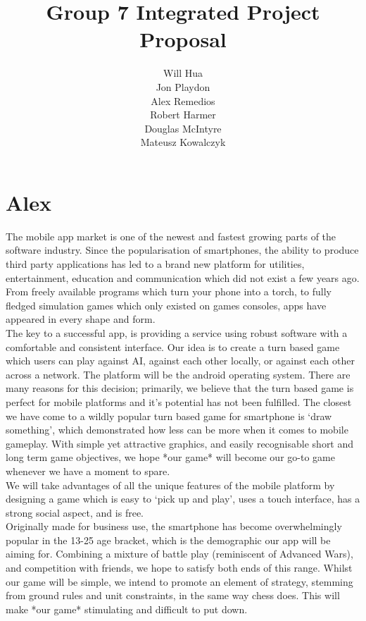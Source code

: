 \documentclass[10pt,a4paper,oneside]{report}
\begin{document}
\title{Group 7 Integrated Project Proposal}
\author{Will Hua\\
        Jon Playdon\\
        Alex Remedios\\
        Robert Harmer\\
        Douglas McIntyre\\
        Mateusz Kowalczyk}
\maketitle
\section*{Alex}

The mobile app market is one of the newest and fastest growing parts of the software industry. Since the popularisation of smartphones, the ability to produce third party applications has led to a brand new platform for utilities, entertainment, education and communication which did not exist a few years ago. From freely available programs which turn your phone into a torch, to fully fledged simulation games which only existed on games consoles, apps have appeared in every shape and form.\\


The key to a successful app, is providing a service using robust software with a comfortable and consistent interface. Our idea is to create a turn based game which users can play against AI, against each other locally, or against each other across a network. The platform will be the android operating system. There are many reasons for this decision; primarily, we believe that the turn based game is perfect for mobile platforms and it’s potential has not been fulfilled. The closest we have come to a wildly popular turn based game for smartphone is ‘draw something’, which demonstrated how less can be more when it comes to mobile gameplay. With simple yet attractive graphics, and easily recognisable short and long term game objectives, we hope *our game* will become our go-to game whenever we have a moment to spare.\\
We will take advantages of all the unique features of the mobile platform by designing a game which is easy to ‘pick up and play’, uses a touch interface, has a strong social aspect, and is free.\\


Originally made for business use, the smartphone has become overwhelmingly popular in the 13-25 age bracket, which is the demographic our app will be aiming for. Combining a mixture of battle play (reminiscent of Advanced Wars), and competition with friends, we hope to satisfy both ends of this range. Whilst our game will be simple, we intend to promote an element of strategy, stemming from ground rules and unit constraints, in the same way chess does. This will make *our game* stimulating and difficult to put down.\\
\end{document}
